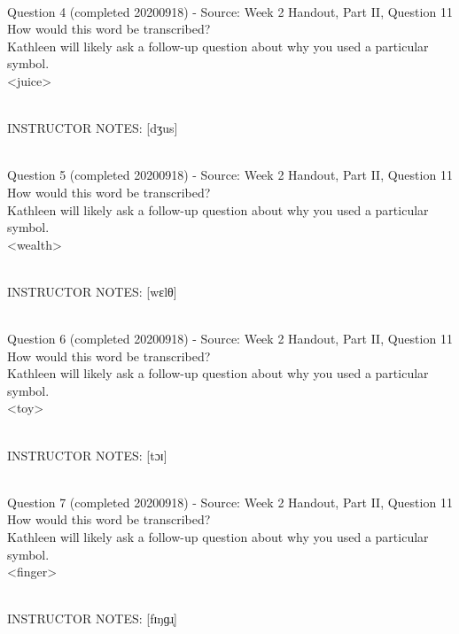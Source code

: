 \documentclass[12pt]{article}
\begin{document}
~\\

{\large Question 4} (completed 20200918) - Source: Week 2 Handout, Part II, Question 11\\

How would this word be transcribed?\\ Kathleen will likely ask a follow-up question about why you used a particular symbol.\\

<juice>


~\\
INSTRUCTOR NOTES: [dʒus]


~\\

{\large Question 5} (completed 20200918) - Source: Week 2 Handout, Part II, Question 11\\

How would this word be transcribed?\\ Kathleen will likely ask a follow-up question about why you used a particular symbol.\\

<wealth>


~\\
INSTRUCTOR NOTES: [wɛlθ]


~\\

{\large Question 6} (completed 20200918) - Source: Week 2 Handout, Part II, Question 11\\

How would this word be transcribed?\\ Kathleen will likely ask a follow-up question about why you used a particular symbol.\\

<toy>


~\\
INSTRUCTOR NOTES: [tɔɪ]


~\\

{\large Question 7} (completed 20200918) - Source: Week 2 Handout, Part II, Question 11\\

How would this word be transcribed?\\ Kathleen will likely ask a follow-up question about why you used a particular symbol.\\

<finger>


~\\
INSTRUCTOR NOTES: [fɪŋɡɹ̩]
\end{document}
